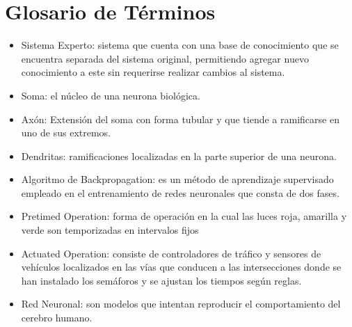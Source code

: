 \chapter{Glosario de T\'{e}rminos}
	\label{chap:term}
	
\begin{itemize}
  \item Sistema Experto: sistema que cuenta con una base de conocimiento que se
  encuentra separada del sistema original, permitiendo agregar nuevo conocimiento a este sin requerirse realizar cambios al sistema.
  \item Soma: el n\'{u}cleo de una neurona biol\'{o}gica.
  \item Ax\'{o}n: Extensi\'{o}n del soma con forma tubular y que tiende a ramificarse en
  uno de sus extremos.
  \item Dendritas: ramificaciones localizadas en la parte superior de una
  neurona.
  \item Algoritmo de Backpropagation: es un m\'{e}todo de aprendizaje supervisado
  empleado en el entrenamiento de redes neuronales que consta de dos fases.
  \item Pretimed Operation: forma de operaci\'{o}n en la cual las luces roja,
  amarilla y verde son temporizadas en intervalos fijos
  \item Actuated Operation: consiste de controladores de tr\'{a}fico y sensores de
  veh\'{i}culos localizados en las v\'{i}as que conducen a las intersecciones donde se han instalado los sem\'{a}foros y se ajustan los tiempos seg\'{u}n reglas.
  \item Red Neuronal: son modelos que intentan reproducir el comportamiento
  del cerebro humano.
  
\end{itemize}
